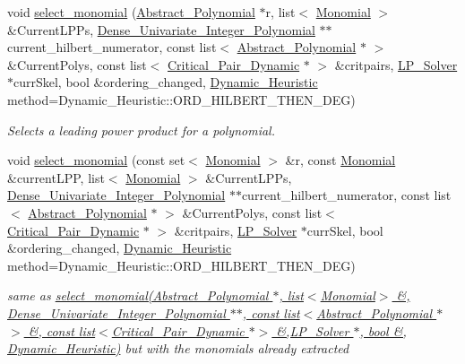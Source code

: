 \begin{DoxyCompactItemize}
void \hyperlink{group___g_b_computation_gaa01d88c431b84deabf51ee116d7d2a0e}{select\+\_\+monomial} (\hyperlink{group__polygroup_class_abstract___polynomial}{Abstract\+\_\+\+Polynomial} $\ast$r, list$<$ \hyperlink{group__polygroup_class_monomial}{Monomial} $>$ \&Current\+L\+P\+Ps, \hyperlink{group__polygroup_class_dense___univariate___integer___polynomial}{Dense\+\_\+\+Univariate\+\_\+\+Integer\+\_\+\+Polynomial} $\ast$$\ast$current\+\_\+hilbert\+\_\+numerator, const list$<$ \hyperlink{group__polygroup_class_abstract___polynomial}{Abstract\+\_\+\+Polynomial} $\ast$ $>$ \&Current\+Polys, const list$<$ \hyperlink{group___g_b_computation_class_critical___pair___dynamic}{Critical\+\_\+\+Pair\+\_\+\+Dynamic} $\ast$ $>$ \&critpairs, \hyperlink{group___c_l_s_solvers_class_l_p___solvers_1_1_l_p___solver}{L\+P\+\_\+\+Solver} $\ast$curr\+Skel, bool \&ordering\+\_\+changed, \hyperlink{group___g_b_computation_ga819b1fd40d9a40ff303df3b90647ecb0}{Dynamic\+\_\+\+Heuristic} method=Dynamic\+\_\+\+Heuristic\+::\+O\+R\+D\+\_\+\+H\+I\+L\+B\+E\+R\+T\+\_\+\+T\+H\+E\+N\+\_\+\+D\+EG)
\begin{DoxyCompactList}\small\item\em Selects a leading power product for a polynomial. \end{DoxyCompactList}\item 
void \hyperlink{group___g_b_computation_gabe3fa16acb0927bac0b16e3a4cf4b4f5}{select\+\_\+monomial} (const set$<$ \hyperlink{group__polygroup_class_monomial}{Monomial} $>$ \&r, const \hyperlink{group__polygroup_class_monomial}{Monomial} \&current\+L\+PP, list$<$ \hyperlink{group__polygroup_class_monomial}{Monomial} $>$ \&Current\+L\+P\+Ps, \hyperlink{group__polygroup_class_dense___univariate___integer___polynomial}{Dense\+\_\+\+Univariate\+\_\+\+Integer\+\_\+\+Polynomial} $\ast$$\ast$current\+\_\+hilbert\+\_\+numerator, const list$<$ \hyperlink{group__polygroup_class_abstract___polynomial}{Abstract\+\_\+\+Polynomial} $\ast$ $>$ \&Current\+Polys, const list$<$ \hyperlink{group___g_b_computation_class_critical___pair___dynamic}{Critical\+\_\+\+Pair\+\_\+\+Dynamic} $\ast$ $>$ \&critpairs, \hyperlink{group___c_l_s_solvers_class_l_p___solvers_1_1_l_p___solver}{L\+P\+\_\+\+Solver} $\ast$curr\+Skel, bool \&ordering\+\_\+changed, \hyperlink{group___g_b_computation_ga819b1fd40d9a40ff303df3b90647ecb0}{Dynamic\+\_\+\+Heuristic} method=Dynamic\+\_\+\+Heuristic\+::\+O\+R\+D\+\_\+\+H\+I\+L\+B\+E\+R\+T\+\_\+\+T\+H\+E\+N\+\_\+\+D\+EG)
\begin{DoxyCompactList}\small\item\em same as {\ttfamily \hyperlink{group___g_b_computation_gaa01d88c431b84deabf51ee116d7d2a0e}{select\+\_\+monomial(\+Abstract\+\_\+\+Polynomial $\ast$, list$<$\+Monomial$>$ \&, Dense\+\_\+\+Univariate\+\_\+\+Integer\+\_\+\+Polynomial $\ast$$\ast$, const list$<$\+Abstract\+\_\+\+Polynomial $\ast$$>$ \&, const list$<$\+Critical\+\_\+\+Pair\+\_\+\+Dynamic $\ast$$>$ \&,\+L\+P\+\_\+\+Solver $\ast$, bool \&, Dynamic\+\_\+\+Heuristic)}} but with the monomials already extracted \end{DoxyCompactList}\item 

\end{DoxyCompactItemize}
